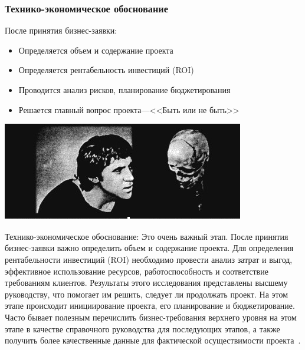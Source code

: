 \documentclass{../industrial-development}
\begin{document}
\begin{frame} \frametitle{Технико-экономическое обоснование}
После принятия бизнес-заявки:
\begin{itemize}
	\item Определяется объем и содержание проекта
	\item Определяется рентабельность инвестиций (ROI)
	\item Проводится анализ рисков, планирование бюджетирования
	\item Решается главный вопрос проекта---<<Быть или не быть>>
\end{itemize}
\centerline{\includegraphics[height=0.50\textheight]{g.png}}
\end{frame}
\lecturenotes
Технико-экономическое обоснование:
Это очень важный этап. После принятия бизнес-заявки важно определить объем и содержание проекта. Для определения рентабельности инвестиций (ROI) необходимо провести анализ затрат и выгод, эффективное использование ресурсов, работоспособность и соответствие требованиям клиентов. Результаты этого исследования представлены высшему руководству, что помогает им решить, следует ли продолжать проект. На этом этапе происходит инициирование проекта, его планирование и бюджетирование. Часто бывает полезным перечислить бизнес-требования верхнего уровня на этом этапе в качестве справочного руководства для последующих этапов, а также получить более качественные данные для фактической осуществимости проекта~\cite{SDLC}.
\end{document}
